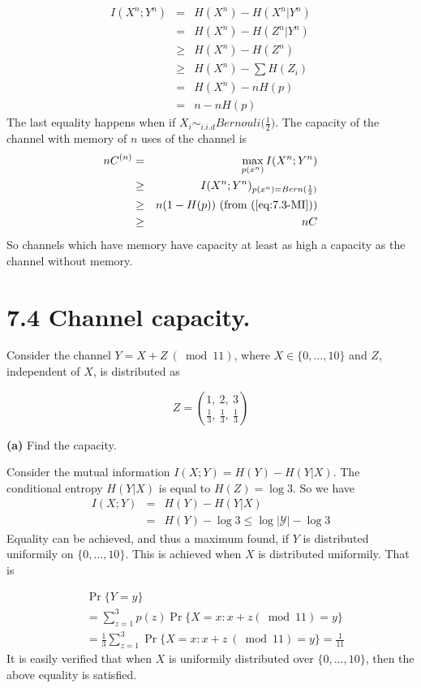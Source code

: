 \documentclass[10pt]{article}
\newcommand{\setbrace}[1]{{\{#1\}}}
\begin{document}
\begin{tiny}
\begin{multicols}{3}
\begin{eqnarray}
    I(X^n;Y^n) &=& H(X^n) - H(X^n|Y^n) \nonumber \\
    &=& H(X^n) - H(Z^n|Y^n) \nonumber\\
    &\ge& H(X^n) - H(Z^n) \nonumber\\
    &\ge& H(X^n) - \sum H(Z_i) \nonumber\\
    &=& H(X^n) - nH(p) \nonumber\\
    &=& n - nH(p) \label{eq:7.3-MI}
\end{eqnarray}
The last equality happens when if $X_i \sim_{i.i.d} Bernouli\big(\frac{1}{2}\big)$.
The capacity of the channel with memory of $n$ uses of the channel is
\begin{eqnarray*}
    nC^{(n)} &=& \max_{p(x^n)} I(X^n; Y^n) \\
    &\ge& I(X^n;Y^n)_{p(x^n)=Bern(\frac{1}{2})} \\
    &\ge& n ( 1 - H(p)) \text{ (from (\ref{eq:7.3-MI}))} \\
    &\ge& nC
\end{eqnarray*}
So channels which have memory have capacity at least as high a capacity as the channel without memory.

\section*{7.4 Channel capacity.}

Consider the channel $Y=X+Z\ (\bmod 11)$, where $X \in \setbrace{0,\dots,10}$ and $Z$, independent of $X$, is distributed as

\begin{equation*}
    Z = {{1,\ 2,\ 3}\choose{\frac{1}{3},\ \frac{1}{3},\ \frac{1}{3}}}
\end{equation*}


\textbf{(a)} Find the capacity.

Consider the mutual information $I(X;Y) = H(Y) - H(Y|X)$. The conditional
entropy $H(Y|X)$ is equal to $H(Z)=\log 3$.
So we have
\begin{eqnarray*}
    I(X;Y) &=& H(Y) - H(Y|X)  \\
    &=& H(Y) - \log 3 
    \leq \log {\vert \mathcal{Y} \vert} - \log 3 \label{eq:7.4-cap}
\end{eqnarray*}
Equality can be achieved, and thus a maximum found, if $Y$ is distributed
uniformily on $\setbrace{0,\dots,10}$. This is achieved when $X$ is
distributed uniformily. That is


\begin{align*}
    &\Pr \setbrace{Y=y} \\
    &= \sum_{z=1}^{3}p(z) \Pr \setbrace{X=x : x+z (\bmod 11) = y} \\
    &= \frac{1}{3}\sum_{z=1}^{3} \Pr \setbrace{X = x : x+z\ (\bmod 11) = y} = \frac{1}{11}
\end{align*}
It is easily verified that when $X$ is uniformily distributed over
$\setbrace{0,\dots,10}$, then the above equality is satisfied.


\end{multicols}
\end{tiny}
\end{document}
